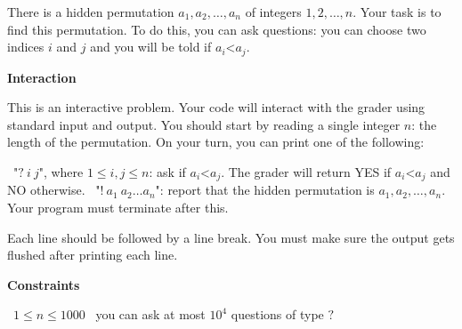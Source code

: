 There is a hidden permutation $a_1, a_2,\dots, a_n$ of integers $1, 2,\dots, n$. Your task is to find this permutation.
To do this, you can ask questions: you can choose two indices $i$ and $j$ and you will be told if $a_i $<$ a_j$.

\vspace{0.3cm}\noindent\textbf{Interaction}

This is an interactive problem. Your code will interact with the grader using standard input and output. You should start by reading a single integer $n$: the length of the permutation.
On your turn, you can print one of the following:

\textbullet\ "$?\ i\ j$", where $1 \le i, j \le n$: ask if $a_i $<$ a_j$. The grader will return YES if $a_i $<$ a_j$ and NO otherwise.
\textbullet\ "$!\ a_1\ a_2 \dots a_n$": report that the hidden permutation is $a_1, a_2,\dots, a_n$. Your program must terminate after this.

Each line should be followed by a line break. You must make sure the output gets flushed after printing each line.

\vspace{0.3cm}\noindent\textbf{Constraints}

\textbullet\ $1 \le n \le 1000$
\textbullet\ you can ask at most $10^4$ questions of type $?$